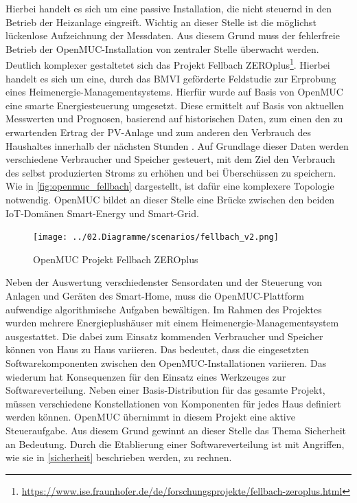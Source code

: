 Hierbei handelt es sich um eine passive Installation, die nicht steuernd in den Betrieb der Heizanlage eingreift. 
Wichtig an dieser Stelle ist die möglichst lückenlose Aufzeichnung der Messdaten.
Aus diesem Grund muss der fehlerfreie Betrieb der OpenMUC-Installation von zentraler Stelle überwacht werden.\\

Deutlich komplexer gestaltetet sich das Projekt Fellbach ZEROplus\footnote{\url{https://www.ise.fraunhofer.de/de/forschungsprojekte/fellbach-zeroplus.html}}.
Hierbei handelt es sich um eine, durch das \ac{BMVI} geförderte Feldstudie zur Erprobung eines Heimenergie-Managementsystems.
Hierfür wurde auf Basis von OpenMUC eine smarte Energiesteuerung umgesetzt.
Diese ermittelt auf Basis von aktuellen Messwerten und Prognosen, basierend auf historischen Daten, zum einen den zu erwartenden Ertrag der PV-Anlage und zum 
anderen den Verbrauch des Haushaltes innerhalb der nächsten Stunden \cite{fellbach}.
Auf Grundlage dieser Daten werden verschiedene Verbraucher und Speicher gesteuert, mit dem Ziel den Verbrauch des selbst produzierten Stroms zu erhöhen und bei Überschüssen 
zu speichern. Wie in \autoref{fig:openmuc_fellbach} dargestellt, ist dafür eine komplexere Topologie notwendig.
OpenMUC bildet an dieser Stelle eine Brücke zwischen den beiden \ac{IoT}-Domänen Smart-Energy und Smart-Grid.

\begin{figure}[h]
 \centering
 \texttt{[image: ../02.Diagramme/scenarios/fellbach\_v2.png]}
 \caption{OpenMUC Projekt Fellbach ZEROplus}
 \label{fig:openmuc_fellbach}
\end{figure}

Neben der Auswertung verschiedenster Sensordaten und der Steuerung von Anlagen und Geräten des Smart-Home, muss die OpenMUC-Plattform 
aufwendige algorithmische Aufgaben bewältigen. Im Rahmen des Projektes wurden mehrere Energieplushäuser mit einem Heimenergie-Managementsystem ausgestattet.
Die dabei zum Einsatz kommenden Verbraucher und Speicher können von Haus zu Haus variieren. Das bedeutet, dass die eingesetzten Softwarekomponenten 
zwischen den OpenMUC-Installationen variieren. Das wiederum hat Konsequenzen für den Einsatz eines Werkzeuges zur Softwareverteilung. 
Neben einer Basis-Distribution für das gesamte Projekt, müssen verschiedene Konstellationen von Komponenten für jedes Haus definiert werden können.
OpenMUC übernimmt in diesem Projekt eine aktive Steueraufgabe. Aus diesem Grund gewinnt an dieser Stelle das Thema Sicherheit an Bedeutung. 
Durch die Etablierung einer Softwareverteilung ist mit Angriffen, wie sie in \autoref{sicherheit} beschrieben werden, zu rechnen.\\

